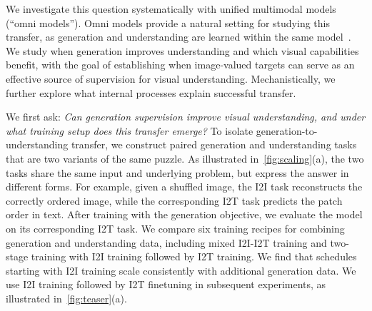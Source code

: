 We investigate this question systematically with unified multimodal models (``omni models''). 
Omni models provide a natural setting for studying this transfer, as generation and understanding are learned within the same model~\citep{metaqueries,wu2025harmonizing,bagel,han2025tv2tv}.
We study when generation improves understanding and which visual capabilities benefit, with the goal of establishing when image-valued targets can serve as an effective source of supervision for visual understanding.
Mechanistically, we further explore what internal processes explain successful transfer.


We first ask: \emph{Can generation supervision improve visual understanding, and under what training setup does this transfer emerge?}
To isolate generation-to-understanding transfer, we construct paired generation and understanding tasks that are two variants of the same puzzle.
As illustrated in~\autoref{fig:scaling}(a), the two tasks share the same input and underlying problem, but express the answer in different forms.
For example, given a shuffled image, the I2I task reconstructs the correctly ordered image, while the corresponding I2T task predicts the patch order in text.
After training with the generation objective, we evaluate the model on its
corresponding I2T task.
We compare six training recipes for combining generation and understanding data, including mixed I2I-I2T training and two-stage training with I2I training followed by I2T training.
We find that schedules starting with I2I training scale consistently with additional generation data.
We use I2I training followed by I2T finetuning in subsequent experiments, as illustrated in~\autoref{fig:teaser}(a).

